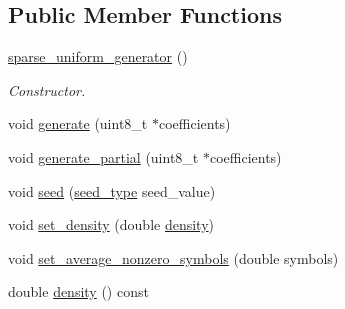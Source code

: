 \subsection*{Public Member Functions}
\begin{DoxyCompactItemize}
\item 
\hypertarget{classkodo_1_1sparse__uniform__generator_a4927d9fd9aeaf63912bce71034a5d183}{\hyperlink{classkodo_1_1sparse__uniform__generator_a4927d9fd9aeaf63912bce71034a5d183}{sparse\-\_\-uniform\-\_\-generator} ()}\label{classkodo_1_1sparse__uniform__generator_a4927d9fd9aeaf63912bce71034a5d183}

\begin{DoxyCompactList}\small\item\em Constructor. \end{DoxyCompactList}\item 
void \hyperlink{classkodo_1_1sparse__uniform__generator_ae113d7fdae892368f99c01ffece3a2ee}{generate} (uint8\-\_\-t $\ast$coefficients)
\begin{DoxyCompactList}\small\item\em \end{DoxyCompactList}\item 
void \hyperlink{classkodo_1_1sparse__uniform__generator_acc22e39f6ec6bf76c3497afff9ee6efc}{generate\-\_\-partial} (uint8\-\_\-t $\ast$coefficients)
\begin{DoxyCompactList}\small\item\em \end{DoxyCompactList}\item 
void \hyperlink{classkodo_1_1sparse__uniform__generator_a2cd10b51fcf7c4de4c41dd09d55ab022}{seed} (\hyperlink{classkodo_1_1sparse__uniform__generator_aeb3e18efa56b33dcf69160029df5fff9}{seed\-\_\-type} seed\-\_\-value)
\begin{DoxyCompactList}\small\item\em \end{DoxyCompactList}\item 
void \hyperlink{classkodo_1_1sparse__uniform__generator_a673a4a5c1bd72d9caf2bef656e45daec}{set\-\_\-density} (double \hyperlink{classkodo_1_1sparse__uniform__generator_ae5760886306dc2627a4379d7d70e0cd7}{density})
\item 
void \hyperlink{classkodo_1_1sparse__uniform__generator_a521a0a8a6d2b8973055cc06f618c9101}{set\-\_\-average\-\_\-nonzero\-\_\-symbols} (double symbols)
\item 
double \hyperlink{classkodo_1_1sparse__uniform__generator_ae5760886306dc2627a4379d7d70e0cd7}{density} () const 
\end{DoxyCompactItemize}


